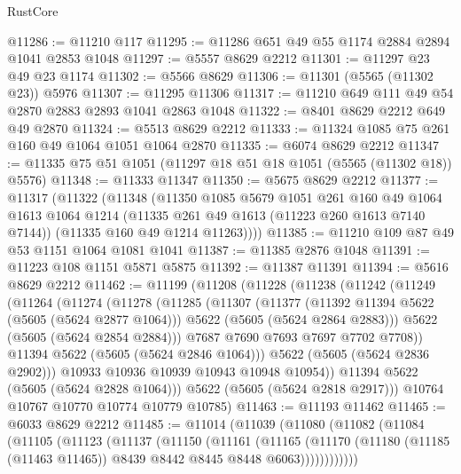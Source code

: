 \begin{lexlean}{RustCore}
\begin{coremodule}
@11286 := @11210 @117
@11295 := @11286 @651 @49 @55 @1174 @2884 @2894 @1041 @2853 @1048
@11297 := @5557 @8629 @2212
@11301 := @11297 @23 @49 @23 @1174
@11302 := @5566 @8629
@11306 := @11301 (@5565 (@11302 @23)) @5976
@11307 := @11295 @11306
@11317 := @11210 @649 @111 @49 @54 @2870 @2883 @2893 @1041 @2863 @1048
@11322 := @8401 @8629 @2212 @649 @49 @2870
@11324 := @5513 @8629 @2212
@11333 := @11324 @1085 @75 @261 @160 @49 @1064 @1051 @1064 @2870
@11335 := @6074 @8629 @2212
@11347 := @11335 @75 @51 @1051 (@11297 @18 @51 @18 @1051 (@5565 (@11302 @18)) @5576)
@11348 := @11333 @11347
@11350 := @5675 @8629 @2212
@11377 := @11317
    (@11322
      (@11348
        (@11350
          @1085
          @5679
          @1051
          @261
          @160
          @49
          @1064
          @1613
          @1064
          @1214
          (@11335 @261 @49 @1613 (@11223 @260 @1613 @7140 @7144))
          (@11335 @160 @49 @1214 @11263))))
@11385 := @11210 @109 @87 @49 @53 @1151 @1064 @1081 @1041
@11387 := @11385 @2876 @1048
@11391 := @11223 @108 @1151 @5871 @5875
@11392 := @11387 @11391
@11394 := @5616 @8629 @2212
@11462 := @11199
    (@11208
      (@11228
        (@11238
          (@11242
            (@11249
              (@11264
                (@11274
                  (@11278
                    (@11285
                      (@11307
                        (@11377
                          (@11392 @11394 @5622 (@5605 (@5624 @2877 @1064)))
                          @5622
                          (@5605 (@5624 @2864 @2883)))
                        @5622
                        (@5605 (@5624 @2854 @2884)))
                      @7687
                      @7690
                      @7693
                      @7697
                      @7702
                      @7708))
                  @11394
                  @5622
                  (@5605 (@5624 @2846 @1064)))
                @5622
                (@5605 (@5624 @2836 @2902)))
              @10933
              @10936
              @10939
              @10943
              @10948
              @10954))
          @11394
          @5622
          (@5605 (@5624 @2828 @1064)))
        @5622
        (@5605 (@5624 @2818 @2917)))
      @10764
      @10767
      @10770
      @10774
      @10779
      @10785)
@11463 := @11193 @11462
@11465 := @6033 @8629 @2212
@11485 := @11014
    (@11039
      (@11080
        (@11082
          (@11084
            (@11105
              (@11123
                (@11137
                  (@11150
                    (@11161
                      (@11165
                        (@11170
                          (@11180 (@11185 (@11463 @11465)) @8439 @8442 @8445 @8448 @6063))))))))))))

\end{coremodule}
\end{lexlean}
